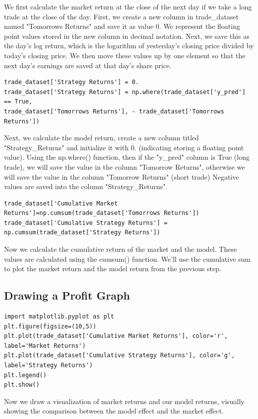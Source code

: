 \documentclass{article}
\begin{document}
We first calculate the market return at the close of the next day if we take a long trade at the close of the day. First, we create a new column in trade\_dataset named "Tomorrows Returns" and save it as value 0. We represent the floating point values stored in the new column in decimal notation. Next, we save this as the day's log return, which is the logarithm of yesterday's closing price divided by today's closing price. We then move these values up by one element so that the next day's earnings are saved at that day's share price.
\begin{verbatim}
trade_dataset['Strategy Returns'] = 0.
trade_dataset['Strategy Returns'] = np.where(trade_dataset['y_pred'] == True,
trade_dataset['Tomorrows Returns'], - trade_dataset['Tomorrows Returns'])
\end{verbatim}
Next, we calculate the model return, create a new column titled "Strategy\_Returns" and initialize it with 0. (indicating storing a floating point value). Using the np.where() function, then if the "y\_pred" column is True (long trade), we will save the value in the column "Tomorrow Returns", otherwise we will save the value in the column "Tomorrow Returns" (short trade) Negative values are saved into the column "Strategy\_Returns".
\begin{verbatim}
trade_dataset['Cumulative Market Returns']=np.cumsum(trade_dataset['Tomorrows Returns'])
trade_dataset['Cumulative Strategy Returns'] = 
np.cumsum(trade_dataset['Strategy Returns'])
\end{verbatim}
Now we calculate the cumulative return of the market and the model. These values are calculated using the cumsum() function. We'll use the cumulative sum to plot the market return and the model return from the previous step.

\subsection{Drawing a Profit Graph}
\begin{verbatim}
import matplotlib.pyplot as plt
plt.figure(figsize=(10,5))
plt.plot(trade_dataset['Cumulative Market Returns'], color='r', label='Market Returns')
plt.plot(trade_dataset['Cumulative Strategy Returns'], color='g', 
label='Strategy Returns')
plt.legend()
plt.show()
\end{verbatim}
Now we draw a visualization of market returns and our model returns, visually showing the comparison between the model effect and the market effect.
\end{document}
